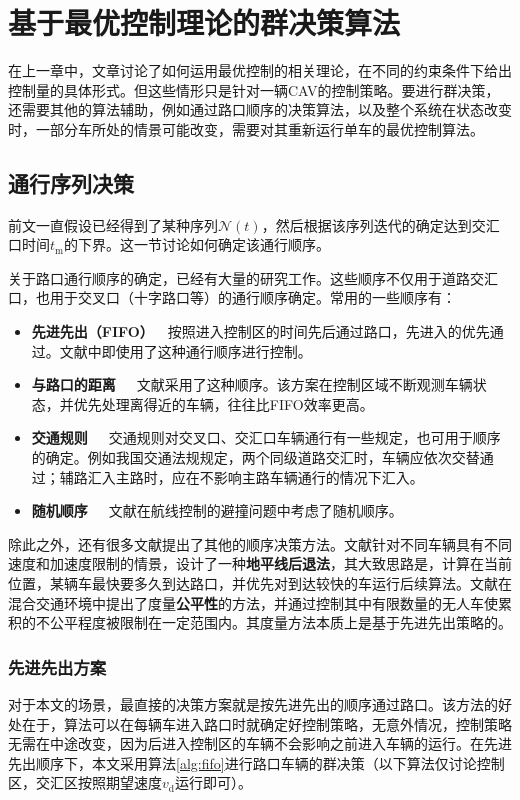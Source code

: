 \chapter{基于最优控制理论的群决策算法}
在上一章中，文章讨论了如何运用最优控制的相关理论，在不同的约束条件下给出控制量的具体形式。但这些情形只是针对一辆CAV的控制策略。要进行群决策，还需要其他的算法辅助，例如通过路口顺序的决策算法，以及整个系统在状态改变时，一部分车所处的情景可能改变，需要对其重新运行单车的最优控制算法。

\section{通行序列决策}
前文一直假设已经得到了某种序列$\mathcal{N}(t)$，然后根据该序列迭代的确定达到交汇口时间$t_\mathrm{m}$的下界。这一节讨论如何确定该通行顺序。

关于路口通行顺序的确定，已经有大量的研究工作。这些顺序不仅用于道路交汇口，也用于交叉口（十字路口等）的通行顺序确定。常用的一些顺序有：
\begin{itemize}
\item \textbf{先进先出（FIFO）}\ \ 按照进入控制区的时间先后通过路口，先进入的优先通过。文献\cite{Kim2013Collision,Azimi2011Vehicular}中即使用了这种通行顺序进行控制。
\item \textbf{与路口的距离}\ \ \ 文献\cite{Fankhauser2011Collision}采用了这种顺序。该方案在控制区域不断观测车辆状态，并优先处理离得近的车辆，往往比FIFO效率更高。
\item \textbf{交通规则}\ \ \ 交通规则对交叉口、交汇口车辆通行有一些规定，也可用于顺序的确定。例如我国交通法规规定，两个同级道路交汇时，车辆应依次交替通过；辅路汇入主路时，应在不影响主路车辆通行的情况下汇入。
\item \textbf{随机顺序}\ \ \ 文献\cite{Chaloulos2010Distributed}在航线控制的避撞问题中考虑了随机顺序。
\end{itemize}

除此之外，还有很多文献提出了其他的顺序决策方法。文献\cite{Campos2017Traffic}针对不同车辆具有不同速度和加速度限制的情景，设计了一种\textbf{地平线后退法}，其大致思路是，计算在当前位置，某辆车最快要多久到达路口，并优先对到达较快的车运行后续算法。文献\cite{Baselt2014Merging}在混合交通环境中提出了度量\textbf{公平性}的方法，并通过控制其中有限数量的无人车使累积的不公平程度被限制在一定范围内。其度量方法本质上是基于先进先出策略的。

\subsection{先进先出方案}
对于本文的场景，最直接的决策方案就是按先进先出的顺序通过路口。该方法的好处在于，算法可以在每辆车进入路口时就确定好控制策略，无意外情况，控制策略无需在中途改变，因为后进入控制区的车辆不会影响之前进入车辆的运行。在先进先出顺序下，本文采用算法\eqref{alg:fifo}进行路口车辆的群决策（以下算法仅讨论控制区，交汇区按照期望速度$v_\mathrm{d}$运行即可）。

